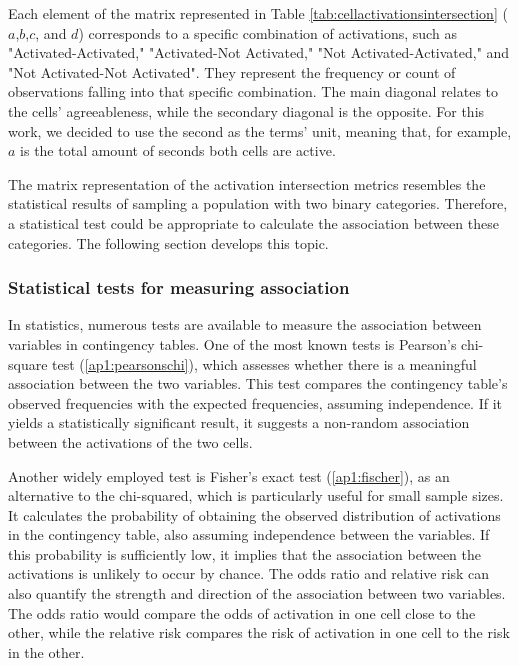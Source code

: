 Each element of the matrix represented in Table \ref{tab:cellactivationsintersection} ($a$,$b$,$c$, and $d$) corresponds to a specific combination of activations, such as "Activated-Activated," "Activated-Not Activated," "Not Activated-Activated," and "Not Activated-Not Activated". They represent the frequency or count of observations falling into that specific combination. The main diagonal relates to the cells' agreeableness, while the secondary diagonal is the opposite. For this work, we decided to use the second as the terms' unit, meaning that, for example, $a$ is the total amount of seconds both cells are active.

The matrix representation of the activation intersection metrics resembles the statistical results of sampling a population with two binary categories. Therefore, a statistical test could be appropriate to calculate the association between these categories. The following section develops this topic.

\subsubsection{Statistical tests for measuring association}

In statistics, numerous tests are available to measure the association between variables in contingency tables. One of the most known tests is Pearson's chi-square test (\ref{ap1:pearsonschi}), which assesses whether there is a meaningful association between the two variables. This test compares the contingency table's observed frequencies with the expected frequencies, assuming independence. If it yields a statistically significant result, it suggests a non-random association between the activations of the two cells.

Another widely employed test is Fisher's exact test (\ref{ap1:fischer}), as an alternative to the chi-squared, which is particularly useful for small sample sizes. It calculates the probability of obtaining the observed distribution of activations in the contingency table, also assuming independence between the variables. If this probability is sufficiently low, it implies that the association between the activations is unlikely to occur by chance. The odds ratio and relative risk can also quantify the strength and direction of the association between two variables. The odds ratio would compare the odds of activation in one cell close to the other, while the relative risk compares the risk of activation in one cell to the risk in the other.

